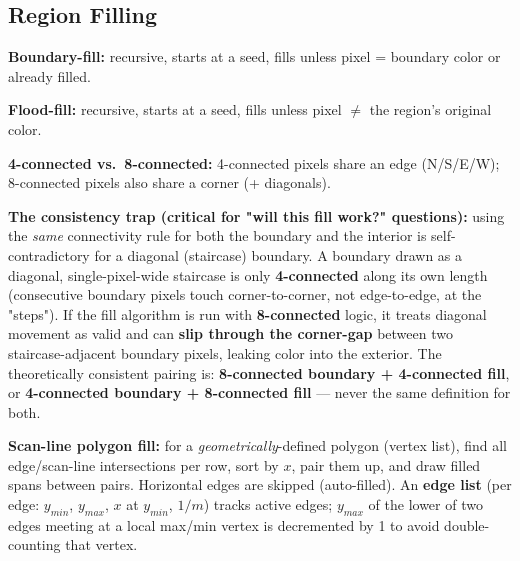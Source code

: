 \documentclass[12pt, a4paper]{article}
\begin{document}
\subsection{Region Filling}
\begin{keypoints}
  \item \textbf{Boundary-fill:} recursive, starts at a seed, fills unless pixel = boundary color or already filled.
  \item \textbf{Flood-fill:} recursive, starts at a seed, fills unless pixel $\ne$ the region's original color.
  \item \textbf{4-connected vs.\ 8-connected:} 4-connected pixels share an edge (N/S/E/W); 8-connected pixels also share a corner (+ diagonals).
  \item \textbf{The consistency trap (critical for "will this fill work?" questions):} using the \emph{same} connectivity rule for both the boundary and the interior is self-contradictory for a diagonal (staircase) boundary. A boundary drawn as a diagonal, single-pixel-wide staircase is only \textbf{4-connected} along its own length (consecutive boundary pixels touch corner-to-corner, not edge-to-edge, at the "steps"). If the fill algorithm is run with \textbf{8-connected} logic, it treats diagonal movement as valid and can \textbf{slip through the corner-gap} between two staircase-adjacent boundary pixels, leaking color into the exterior. The theoretically consistent pairing is: \textbf{8-connected boundary + 4-connected fill}, or \textbf{4-connected boundary + 8-connected fill} --- never the same definition for both.
  \item \textbf{Scan-line polygon fill:} for a \emph{geometrically}-defined polygon (vertex list), find all edge/scan-line intersections per row, sort by $x$, pair them up, and draw filled spans between pairs. Horizontal edges are skipped (auto-filled). An \textbf{edge list} (per edge: $y_{min}$, $y_{max}$, $x$ at $y_{min}$, $1/m$) tracks active edges; $y_{max}$ of the lower of two edges meeting at a local max/min vertex is decremented by 1 to avoid double-counting that vertex.
\end{keypoints}

\end{document}
